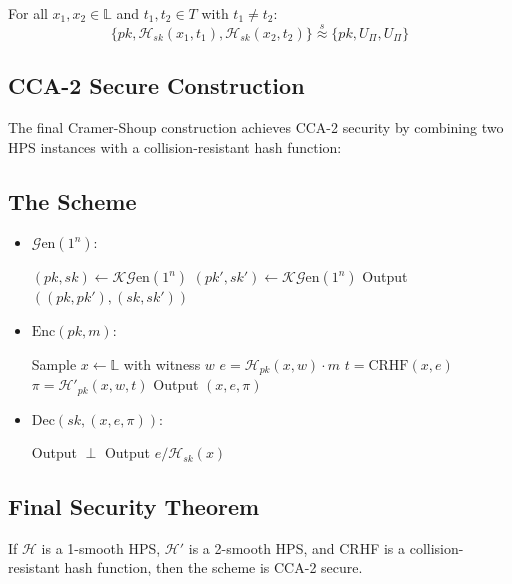 \begin{definition}[2-Smoothness]
For all $x_1,x_2 \in \mathbb{L}$ and $t_1,t_2 \in T$ with $t_1 \neq t_2$:
\[ \{pk, \mathcal{H}_{sk}(x_1,t_1), \mathcal{H}_{sk}(x_2,t_2)\} \stackrel{s}{\approx} \{pk, U_\Pi, U_\Pi\} \]
\end{definition}

\subsection{CCA-2 Secure Construction}

The final Cramer-Shoup construction achieves CCA-2 security by combining two HPS instances with a collision-resistant hash function:

\subsection{The Scheme}

\begin{itemize}
\item $\mathcal{G}\text{en}(1^n)$:
\begin{algorithmic}
    \State $(pk,sk) \leftarrow \mathcal{K}\mathcal{G}\text{en}(1^n)$
    \State $(pk',sk') \leftarrow \mathcal{K}\mathcal{G}\text{en}(1^n)$
    \State Output $((pk,pk'),(sk,sk'))$
\end{algorithmic}

\item $\text{Enc}(pk,m)$:
\begin{algorithmic}
    \State Sample $x \leftarrow \mathbb{L}$ with witness $w$
    \State $e = \mathcal{H}_{pk}(x,w) \cdot m$
    \State $t = \text{CRHF}(x,e)$
    \State $\pi = \mathcal{H}'_{pk}(x,w,t)$
    \State Output $(x,e,\pi)$
\end{algorithmic}

\item $\text{Dec}(sk,(x,e,\pi))$:
\begin{algorithmic}
        \State Output $\perp$
    \EndIf
    \State Output $e/\mathcal{H}_{sk}(x)$
\end{algorithmic}
\end{itemize}

\subsection{Final Security Theorem}

\begin{theorem}
If $\mathcal{H}$ is a 1-smooth HPS, $\mathcal{H}'$ is a 2-smooth HPS, and CRHF is a collision-resistant hash function, then the scheme is CCA-2 secure.
\end{theorem}


